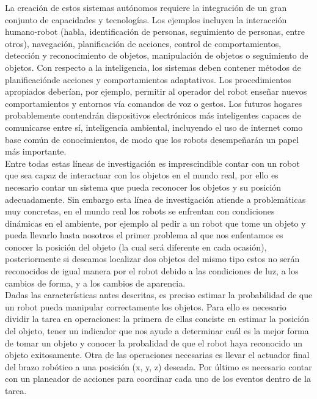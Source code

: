 \documentclass[a4paper, openright, 12pt]{report}
\begin{document}
		La creación de estos sistemas autónomos requiere la integración de un gran conjunto de capacidades y tecnologías. Los ejemplos incluyen la interacción humano-robot (habla, identificación de personas, seguimiento de personas, entre otros), navegación, planificación de acciones, control de comportamientos, detección y reconocimiento de objetos, manipulación de objetos o seguimiento de objetos. Con respecto a la inteligencia, los sistemas deben contener métodos de planificaciónde acciones y comportamientos adaptativos. Los procedimientos apropiados deberían, por ejemplo, permitir al operador del robot enseñar nuevos comportamientos y entornos vía comandos de voz o gestos. Los futuros hogares probablemente contendrán dispositivos electrónicos más inteligentes capaces de comunicarse entre sí, inteligencia ambiental, incluyendo el uso de internet como base común de conocimientos, de modo que los robots desempeñarán un papel más importante.\\

		Entre todas estas líneas de investigación es imprescindible contar con un robot que sea capaz de interactuar con los objetos en el mundo real, por ello es necesario contar un sistema que pueda reconocer los objetos y su posición adecuadamente. Sin embargo esta línea de investigación atiende a problemáticas muy concretas, en el mundo real  los robots se enfrentan con condiciones dinámicas en el ambiente, por ejemplo al pedir a un robot que tome un objeto y pueda llevarlo hasta nosotros el primer problema al que nos enfentamos es conocer la posición del objeto (la cual será diferente en cada ocasión), posteriormente si deseamos localizar dos objetos del mismo tipo estos no serán reconocidos de igual manera por el robot debido a las condiciones de luz, a los cambios de forma, y a los cambios de aparencia.\\


		Dadas las características antes descritas, es preciso estimar la probabilidad de que un robot pueda manipular correctamente los objetos. Para ello es necesario dividir la tarea en operaciones: la primera de ellas conciste en estimar la posición del objeto, tener un indicador que nos ayude a determinar cuál es la mejor forma de tomar un objeto y conocer la probalidad de que el robot haya reconocido un objeto exitosamente. Otra de las operaciones necesarias es llevar el actuador final del brazo robótico a una posición (x, y, z) deseada. Por último es necesario contar con un planeador de acciones para coordinar cada uno de los eventos dentro de la tarea.\\
\end{document}
